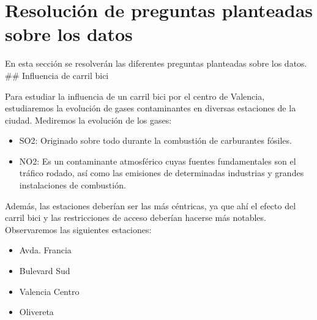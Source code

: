 \documentclass[notspecified,article,submit,moreauthors,pdftex]{Definitions/mdpi}
\providecommand{\tightlist}{%
  \setlength{\itemsep}{0pt}\setlength{\parskip}{0pt}}
\begin{document}
\hypertarget{resoluciuxf3n-de-preguntas-planteadas-sobre-los-datos}{%
\section{Resolución de preguntas planteadas sobre los
datos}\label{resoluciuxf3n-de-preguntas-planteadas-sobre-los-datos}}

En esta sección se resolverán las diferentes preguntas planteadas sobre
los datos. \#\# Influencia de carril bici

Para estudiar la influencia de un carril bici por el centro de Valencia,
estudiaremos la evolución de gases contaminantes en diversas estaciones
de la ciudad. Mediremos la evolución de los gases:

\begin{itemize}
\tightlist
\item
  SO2: Originado sobre todo durante la combustión de carburantes
  fósiles.
\item
  NO2: Es un contaminante atmosférico cuyas fuentes fundamentales son el
  tráfico rodado, así como las emisiones de determinadas industrias y
  grandes instalaciones de combustión.
\end{itemize}

Además, las estaciones deberían ser las más céntricas, ya que ahí el
efecto del carril bici y las restricciones de acceso deberían hacerse
más notables. Observaremos las siguientes estaciones:

\begin{itemize}
\tightlist
\item
  Avda. Francia
\item
  Bulevard Sud
\item
  Valencia Centro
\item
  Olivereta
\end{itemize}
\end{document}
